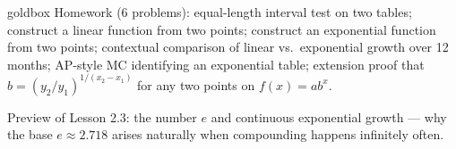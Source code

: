 \documentclass[10pt]{article}
\begin{document}
\begin{skillbox}{goldbox}
Homework (6 problems): equal-length interval test on two tables; construct a linear function
from two points; construct an exponential function from two points; contextual comparison of
linear vs.\ exponential growth over 12 months; AP-style MC identifying an exponential table;
extension proof that $b = (y_2/y_1)^{1/(x_2-x_1)}$ for any two points on $f(x)=ab^x$.

Preview of Lesson 2.3: the number $e$ and continuous exponential growth --- why the base
$e \approx 2.718$ arises naturally when compounding happens infinitely often.
\end{skillbox}
\end{document}
